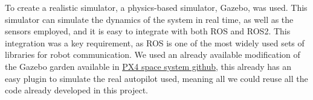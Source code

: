To create a realistic simulator, a physics-based simulator, Gazebo, was used. This simulator can simulate the dynamics of the system in real time, as well as the sensors employed, and it is easy to integrate with both ROS and ROS2. This integration was a key requirement, as ROS is one of the most widely used sets of libraries for robot communication. We used an already available modification of the Gazebo garden available in \href{https://github.com/DISCOWER/PX4-Space-Systems}{PX4 space system github}, this already has an easy plugin to simulate the real autopilot used, meaning all we could reuse all the code already developed in this project.